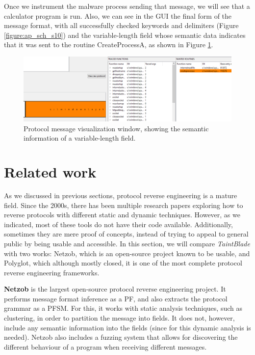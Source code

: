 \documentclass[conference]{IEEEtran}
\begin{document}
Once we instrument the malware process sending that message, we will see that a calculator program
is run. Also, we can see in the GUI the final form of the message format, with all successfully checked
keywords and delimiters (Figure \ref{figure:ap_sch_s10}) and the variable-length field whose semantic
data indicates that it was sent to the routine CreateProcessA, as shown in Figure \ref{figure:ap_sch_s11}.

\begin{figure}[htbp]
    \centerline{\includegraphics[width=1.0\columnwidth]{images/sch_s11.png}}
    \caption{Protocol message visualization window, showing the semantic information of a variable-length field.}
    \label{figure:ap_sch_s11}
\end{figure}

\section{Related work}
As we discussed in previous sections, protocol reverse engineering is a mature field. Since the 2000s, there 
has been multiple research papers exploring how to reverse protocols with different static and dynamic techniques.
However, as we indicated, most of these tools do not have their code available. Additionally, sometimes they are
mere proof of concepts, instead of trying to appeal to general public by being usable and accessible. In this section,
we will compare \textit{TaintBlade} with two works: Netzob, which is an open-source project known to be usable,
and Polyglot, which although mostly closed, it is one of the most complete protocol reverse engineering frameworks. 

\textbf{Netzob} \cite{github_pre_netzob} is the largest open-source protocol reverse engineering project. It performs message
format inference as a PF, and also extracts the protocol grammar as a PFSM. For this, it works with static analysis
techniques, such as clustering\cite{netzob_clustering}, in order to partition the message into fields. It does not,
however, include any semantic information into the fields (since for this dynamic analysis is needed). Netzob also
includes a fuzzing system that allows for discovering the different behaviour of a program when receiving different
messages.
\end{document}
